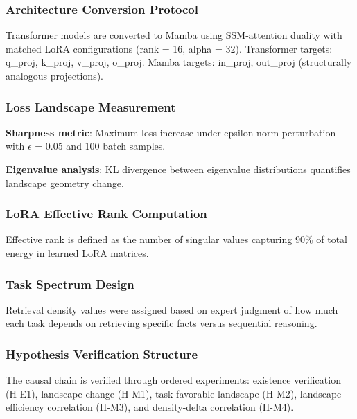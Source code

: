
\subsubsection{Architecture Conversion Protocol}

Transformer models are converted to Mamba using SSM-attention duality with matched LoRA configurations (rank = 16, alpha = 32). Transformer targets: q\_proj, k\_proj, v\_proj, o\_proj. Mamba targets: in\_proj, out\_proj (structurally analogous projections).

\subsubsection{Loss Landscape Measurement}

\textbf{Sharpness metric}: Maximum loss increase under epsilon-norm perturbation with $\epsilon$ = 0.05 and 100 batch samples.

\textbf{Eigenvalue analysis}: KL divergence between eigenvalue distributions quantifies landscape geometry change.

\subsubsection{LoRA Effective Rank Computation}

Effective rank is defined as the number of singular values capturing 90\% of total energy in learned LoRA matrices.

\subsubsection{Task Spectrum Design}

\begin{table}[htbp]
\centering
{}
\end{table}

Retrieval density values were assigned based on expert judgment of how much each task depends on retrieving specific facts versus sequential reasoning.

\subsubsection{Hypothesis Verification Structure}

The causal chain is verified through ordered experiments: existence verification (H-E1), landscape change (H-M1), task-favorable landscape (H-M2), landscape-efficiency correlation (H-M3), and density-delta correlation (H-M4).
